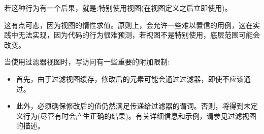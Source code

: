 若这种行为有一个后果，就是:特别使用视图(在视图定义之后立即使用)。

这有点可悲，因为视图的惰性求值。原则上，会允许一些难以置信的用例，这在实践中无法实现，因为代码的行为很难预测，若视图不是特别使用，底层范围可能会改变。


当使用过滤器视图时，写访问有一些重要的附加限制:

\begin{itemize}
\item
首先，由于过滤视图缓存，修改后的元素可能会通过过滤器，即使不应该通过。

\item
此外，必须确保修改后的值仍然满足传递给过滤器的谓词。否则，将得到未定义行为(尽管有时会产生正确的结果)。有关详细信息和示例，请参见过滤视图的描述。
\end{itemize}

